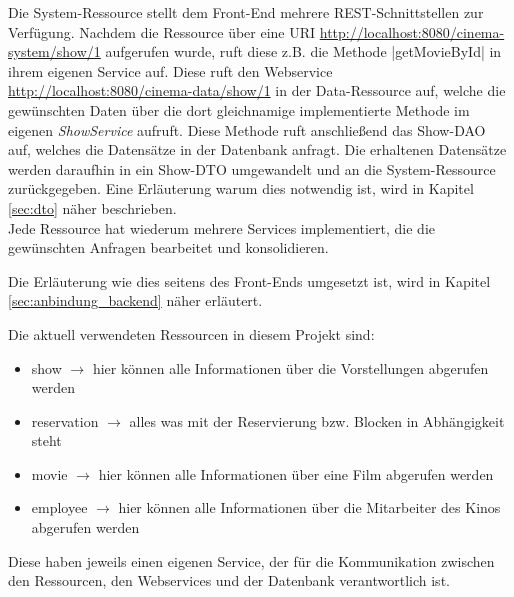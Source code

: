 Die System-Ressource stellt dem Front-End mehrere \acs{REST}-Schnittstellen zur Verfügung.
Nachdem die Ressource über eine \acs{URI} \url{http://localhost:8080/cinema-system/show/1} aufgerufen wurde, ruft diese z.B. die Methode \jinline |getMovieById| in ihrem eigenen Service auf.
Diese ruft den Webservice \url{http://localhost:8080/cinema-data/show/1} in der Data-Ressource auf, welche die gewünschten Daten über die dort gleichnamige implementierte Methode im eigenen \textit{ShowService} aufruft. Diese Methode ruft anschließend das Show-\acs{DAO} auf, welches die Datensätze in der Datenbank anfragt. 
Die erhaltenen Datensätze werden daraufhin in ein Show-\acf{DTO} umgewandelt und an die System-Ressource zurückgegeben.
Eine Erläuterung warum dies notwendig ist, wird in Kapitel \vref{sec:dto} näher beschrieben. \\
Jede Ressource hat wiederum mehrere Services implementiert, die die gewünschten Anfragen bearbeitet und konsolidieren.

Die Erläuterung wie dies seitens des Front-Ends umgesetzt ist, wird in Kapitel \vref{sec:anbindung_backend} näher erläutert.
 

Die aktuell verwendeten Ressourcen in diesem Projekt sind:
\begin{itemize}
	\item show $\rightarrow$ hier können alle Informationen über die Vorstellungen abgerufen werden
	\item reservation $\rightarrow$ alles was mit der Reservierung bzw. Blocken in Abhängigkeit steht 
	\item movie $\rightarrow$ hier können alle Informationen über eine Film abgerufen werden
	\item employee $\rightarrow$ hier können alle Informationen über die Mitarbeiter des Kinos abgerufen werden
\end{itemize} 

Diese haben jeweils einen eigenen Service, der für die Kommunikation zwischen den Ressourcen, den Webservices und der Datenbank verantwortlich ist. 